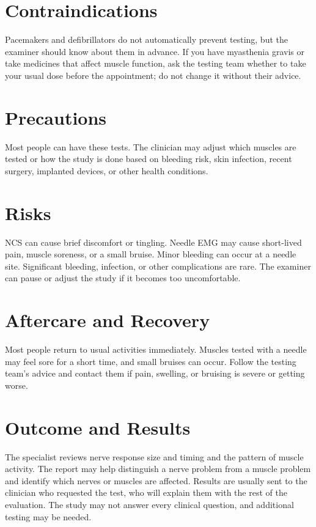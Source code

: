 \section*{Contraindications}
Pacemakers and defibrillators do not automatically prevent testing, but the examiner should know about them in advance. If you have myasthenia gravis or take medicines that affect muscle function, ask the testing team whether to take your usual dose before the appointment; do not change it without their advice.

\section*{Precautions}
Most people can have these tests. The clinician may adjust which muscles are tested or how the study is done based on bleeding risk, skin infection, recent surgery, implanted devices, or other health conditions.

\section*{Risks}
NCS can cause brief discomfort or tingling. Needle EMG may cause short-lived pain, muscle soreness, or a small bruise. Minor bleeding can occur at a needle site. Significant bleeding, infection, or other complications are rare. The examiner can pause or adjust the study if it becomes too uncomfortable.

\section*{Aftercare and Recovery}
Most people return to usual activities immediately. Muscles tested with a needle may feel sore for a short time, and small bruises can occur. Follow the testing team's advice and contact them if pain, swelling, or bruising is severe or getting worse.

\section*{Outcome and Results}
The specialist reviews nerve response size and timing and the pattern of muscle activity. The report may help distinguish a nerve problem from a muscle problem and identify which nerves or muscles are affected. Results are usually sent to the clinician who requested the test, who will explain them with the rest of the evaluation. The study may not answer every clinical question, and additional testing may be needed.

